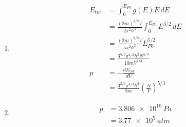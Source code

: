 \documentclass{article}
\begin{document}
\begin{enumerate}
  \item

        \begin{align*}
          E_\text{tot} & = \int_0^{E_{F 0}} g(E) E \,d E                                                \\
                       & = \frac{(2 m)^{3 / 2} V}{2 \pi^2 \hbar^3} \int_0^{E_{F 0}} E^{3 / 2} \,d E     \\
                       & = \frac{(2 m)^{3 / 2} V}{5 \pi^2 \hbar^3} E_{F 0}^{5 / 2}                      \\
                       & = \frac{3^{5 / 3} \pi^{4 / 3} \hbar^2 N^{5 / 3}}{10 m V^{2 / 3}}               \\
          p            & = -\frac{d E_\text{tot}}{d V}                                                  \\
                       & = \frac{3^{2 / 3} \pi^{4 / 3} \hbar^2}{5 m} \left( \frac{N}{V} \right)^{5 / 3}
        \end{align*}

  \item

        \begin{align*}
          p & = \qty{3.806e10}{Pa} \\
            & = \qty{3.77e5}{atm}
        \end{align*}
\end{enumerate}

\setcounter{subsubsection}{54}
\subsubsection{}
\end{document}
